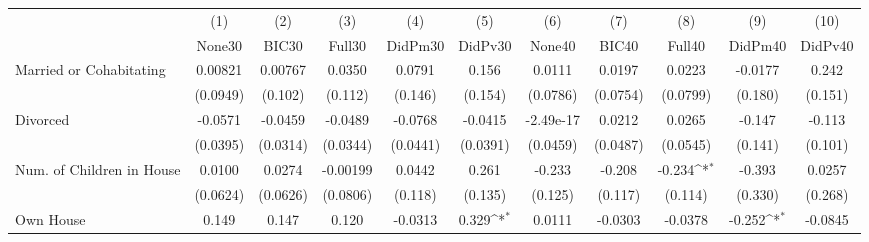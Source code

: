{
\def\sym#1{\ifmmode^{#1}\else\(^{#1}\)\fi}
\begin{tabular}{l*{10}{c}}
\toprule
            &\multicolumn{1}{c}{(1)}&\multicolumn{1}{c}{(2)}&\multicolumn{1}{c}{(3)}&\multicolumn{1}{c}{(4)}&\multicolumn{1}{c}{(5)}&\multicolumn{1}{c}{(6)}&\multicolumn{1}{c}{(7)}&\multicolumn{1}{c}{(8)}&\multicolumn{1}{c}{(9)}&\multicolumn{1}{c}{(10)}\\
            &\multicolumn{1}{c}{None30}&\multicolumn{1}{c}{BIC30}&\multicolumn{1}{c}{Full30}&\multicolumn{1}{c}{DidPm30}&\multicolumn{1}{c}{DidPv30}&\multicolumn{1}{c}{None40}&\multicolumn{1}{c}{BIC40}&\multicolumn{1}{c}{Full40}&\multicolumn{1}{c}{DidPm40}&\multicolumn{1}{c}{DidPv40}\\
\midrule
Married or Cohabitating&     0.00821         &     0.00767         &      0.0350         &      0.0791         &       0.156         &      0.0111         &      0.0197         &      0.0223         &     -0.0177         &       0.242         \\
            &    (0.0949)         &     (0.102)         &     (0.112)         &     (0.146)         &     (0.154)         &    (0.0786)         &    (0.0754)         &    (0.0799)         &     (0.180)         &     (0.151)         \\
\addlinespace
Divorced    &     -0.0571         &     -0.0459         &     -0.0489         &     -0.0768         &     -0.0415         &   -2.49e-17         &      0.0212         &      0.0265         &      -0.147         &      -0.113         \\
            &    (0.0395)         &    (0.0314)         &    (0.0344)         &    (0.0441)         &    (0.0391)         &    (0.0459)         &    (0.0487)         &    (0.0545)         &     (0.141)         &     (0.101)         \\
\addlinespace
Num. of Children in House&      0.0100         &      0.0274         &    -0.00199         &      0.0442         &       0.261         &      -0.233         &      -0.208         &      -0.234\sym{*}  &      -0.393         &      0.0257         \\
            &    (0.0624)         &    (0.0626)         &    (0.0806)         &     (0.118)         &     (0.135)         &     (0.125)         &     (0.117)         &     (0.114)         &     (0.330)         &     (0.268)         \\
\addlinespace
Own House   &       0.149         &       0.147         &       0.120         &     -0.0313         &       0.329\sym{*}  &      0.0111         &     -0.0303         &     -0.0378         &      -0.252\sym{*}  &     -0.0845         \\

\end{tabular}}
